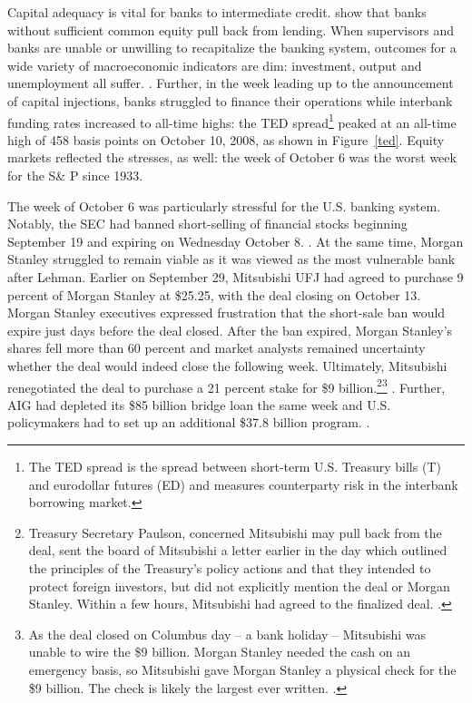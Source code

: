 \documentclass[12pt]{article}
\begin{document}
Capital adequacy is vital for banks to intermediate credit. \citet{Peek} show that banks without sufficient common equity pull back from lending. When supervisors and banks are unable or unwilling to recapitalize the banking system, outcomes for a wide variety of macroeconomic indicators are dim: investment, output and unemployment all suffer. \citep{Hoshi}. Further, in the week leading up to the announcement of capital injections, banks struggled to finance their operations while interbank funding rates increased to all-time highs: the TED spread\footnote{The TED spread is the spread between short-term U.S. Treasury bills (T) and eurodollar futures (ED) and measures counterparty risk in the interbank borrowing market.} peaked at an all-time high of 458 basis points on October 10, 2008, as shown in Figure~\ref{ted}. Equity markets reflected the stresses, as well: the week of October 6 was the worst week for the S\& P since 1933.

The week of October 6 was particularly stressful for the U.S. banking system. Notably, the SEC had banned short-selling of financial stocks beginning September 19 and expiring on Wednesday October 8. \citep{shortban}. At the same time, Morgan Stanley struggled to remain viable as it was viewed as the most vulnerable bank after Lehman. Earlier on September 29, Mitsubishi UFJ had agreed to purchase 9 percent of Morgan Stanley at \$25.25, with the deal closing on October 13. Morgan Stanley executives expressed frustration that the short-sale ban would expire just days before the deal closed. After the ban expired, Morgan Stanley's shares fell more than 60 percent and market analysts remained uncertainty whether the deal would indeed close the following week. Ultimately, Mitsubishi renegotiated the deal to purchase a 21 percent stake for \$9 billion.\footnote{Treasury Secretary Paulson, concerned Mitsubishi may pull back from the deal, sent the board of Mitsubishi a letter earlier in the day which outlined the principles of the Treasury's policy actions and that they intended to protect foreign investors, but did not explicitly mention the deal or Morgan Stanley. Within a few hours, Mitsubishi had agreed to the finalized deal. \citep{paulsonbook}.}\footnote{As the deal closed on Columbus day -- a bank holiday -- Mitsubishi was unable to wire the \$9 billion. Morgan Stanley needed the cash on an emergency basis, so Mitsubishi gave Morgan Stanley a physical check for the \$9 billion. The check is likely the largest ever written. \citep{Sorkin}.} \citep{MUFGMS}. Further, AIG had depleted its \$85 billion bridge loan the same week and U.S. policymakers had to set up an additional \$37.8 billion program. \citep{Geithner}.
\end{document}
